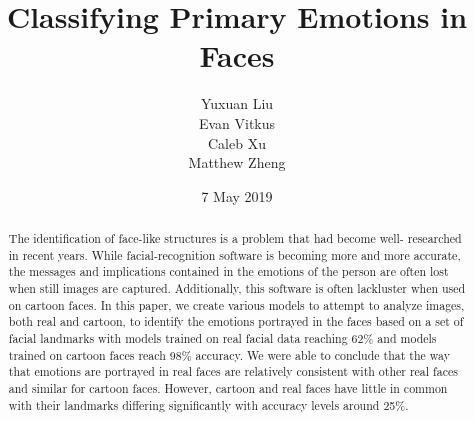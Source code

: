 \documentclass{Project}
\begin{document}
\title{Classifying Primary Emotions in Faces}

\author{
\alignauthor Yuxuan Liu \\
\alignauthor Evan Vitkus \\
\alignauthor Caleb Xu \\
\alignauthor Matthew Zheng \\
}
\date{7 May 2019}
\maketitle
\begin{abstract}

The identification of face-like structures is a problem that had become well-
researched in recent years. While facial-recognition software is becoming more and more
accurate, the messages and implications contained in the emotions of the person 
are often lost when still images are captured. Additionally, this software is often
lackluster when used on cartoon faces. In this paper, we create various 
models to attempt to analyze images, both real and cartoon, to identify the emotions
portrayed in the faces based on a set of facial landmarks with models trained on 
real facial data reaching 62\% and models trained on cartoon faces reach 98\% accuracy.
We were able to conclude that the way that emotions are portrayed in real faces 
are relatively consistent with other real faces and similar for cartoon faces. 
However, cartoon and real faces have little in common with their landmarks differing 
significantly with accuracy levels around 25\%. 

\end{abstract}
\end{document}
